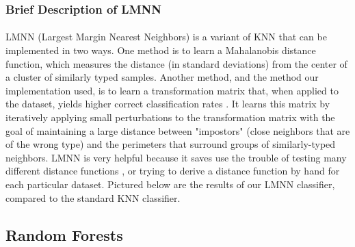 \documentclass[11pt]{article}
\begin{document}
    \subsubsection{Brief Description of LMNN}
    \paragraph{}
    LMNN (Largest Margin Nearest Neighbors) is a variant of KNN that can be implemented in two ways. One method is to learn a Mahalanobis distance function, which measures the distance (in standard deviations) from the center of a cluster of similarly typed samples. Another method, and the method our implementation used, is to learn a transformation matrix that, when applied to the dataset, yields higher correct classification rates \cite{huyen12}. It learns this matrix by iteratively applying small perturbations to the transformation matrix with the goal of maintaining a large distance between "impostors" (close neighbors that are of the wrong type) and the perimeters that surround groups of similarly-typed neighbors. LMNN is very helpful because it saves use the trouble of testing many different distance functions \cite{weinberger}, or trying to derive a distance function by hand for each particular dataset. Pictured below are the results of our LMNN classifier, compared to the standard KNN classifier.
    
\subsection{Random Forests}
\end{document}
